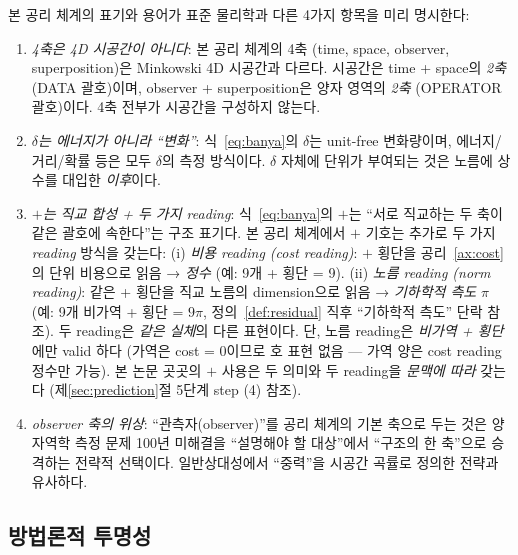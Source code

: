 \documentclass[entropy,article,submit,pdftex,oneauthor]{Definitions/mdpi}
\begin{document}
본 공리 체계의 표기와 용어가 표준 물리학과 다른 4가지 항목을 미리 명시한다:
\begin{enumerate}
\item \emph{4축은 4D 시공간이 아니다}: 본 공리 체계의 4축 (time, space, observer, superposition)은 Minkowski 4D 시공간과 다르다. 시공간은 time + space의 \emph{2축} (DATA 괄호)이며, observer + superposition은 양자 영역의 \emph{2축} (OPERATOR 괄호)이다. 4축 전부가 시공간을 구성하지 않는다.
\item \emph{$\delta$는 에너지가 아니라 ``변화''}: 식~\eqref{eq:banya}의 $\delta$는 unit-free 변화량이며, 에너지/거리/확률 등은 모두 $\delta$의 측정 방식이다. $\delta$ 자체에 단위가 부여되는 것은 노름에 상수를 대입한 \emph{이후}이다.
\item \emph{$+$는 직교 합성 + 두 가지 reading}: 식~\eqref{eq:banya}의 $+$는 ``서로 직교하는 두 축이 같은 괄호에 속한다''는 구조 표기다. 본 공리 체계에서 $+$ 기호는 추가로 두 가지 \emph{reading} 방식을 갖는다: (i) \emph{비용 reading (cost reading)}: $+$ 횡단을 공리~\ref{ax:cost}의 단위 비용으로 읽음 → \emph{정수} (예: 9개 + 횡단 = 9). (ii) \emph{노름 reading (norm reading)}: 같은 + 횡단을 직교 노름의 dimension으로 읽음 → \emph{기하학적 측도} $\pi$ (예: 9개 비가역 + 횡단 = $9\pi$, 정의~\ref{def:residual} 직후 ``기하학적 측도'' 단락 참조).
두 reading은 \emph{같은 실체}의 다른 표현이다. 단, 노름 reading은 \emph{비가역 + 횡단}에만 valid 하다 (가역은 cost = 0이므로 호 표현 없음 — 가역 양은 cost reading 정수만 가능). 본 논문 곳곳의 $+$ 사용은 두 의미와 두 reading을 \emph{문맥에 따라} 갖는다 (제\ref{sec:prediction}절 5단계 step (4) 참조).
\item \emph{observer 축의 위상}: ``관측자(observer)''를 공리 체계의 기본 축으로 두는 것은 양자역학 측정 문제 100년 미해결을 ``설명해야 할 대상''에서 ``구조의 한 축''으로 승격하는 전략적 선택이다. 일반상대성에서 ``중력''을 시공간 곡률로 정의한 전략과 유사하다.
\end{enumerate}


\subsection{방법론적 투명성}
\label{sec:transparency}
\end{document}
